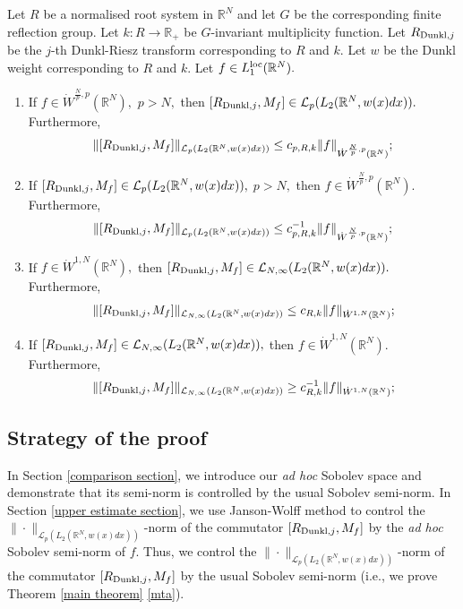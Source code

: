 \documentclass{amsart}
\numberwithin{equation}{section}
\begin{document}
\begin{theorem}\label{main theorem} Let $R$ be a normalised root system in $\mathbb{R}^N$ and let $G$ be the corresponding finite reflection group. Let $k:R\to\mathbb{R}_+$ be $G$-invariant multiplicity function. Let $R_{{\rm Dunkl},j}$ be the $j$-th Dunkl-Riesz transform corresponding to $R$ and $k.$ Let $w$ be the Dunkl weight corresponding to $R$ and $k.$ Let $f\in L_1^{{\rm loc}}(\mathbb{R}^N).$
\begin{enumerate}[{\rm (i)}]
\item\label{mta} If $f\in\dot{W}^{\frac{N}{p},p}(\mathbb{R}^N),$ $p>N,$ then $[R_{{\rm Dunkl},j},M_f]\in\mathcal{L}_p(L_2(\mathbb{R}^N,w(x)dx)).$ Furthermore,
$$\|[R_{{\rm Dunkl},j},M_f]\|_{\mathcal{L}_p(L_2(\mathbb{R}^N,w(x)dx))}\leq c_{p,R,k}\|f\|_{\dot{W}^{\frac{N}{p},p}(\mathbb{R}^N)};$$
\item\label{mtb} If $[R_{{\rm Dunkl},j},M_f]\in\mathcal{L}_p(L_2(\mathbb{R}^N,w(x)dx)),$ $p>N,$ then $f\in\dot{W}^{\frac{N}{p},p}(\mathbb{R}^N).$ Furthermore,
$$\|[R_{{\rm Dunkl},j},M_f]\|_{\mathcal{L}_p(L_2(\mathbb{R}^N,w(x)dx))}\leq c_{p,R,k}^{-1}\|f\|_{\dot{W}^{\frac{N}{p},p}(\mathbb{R}^N)};$$
\item\label{mtc} If $f\in\dot{W}^{1,N}(\mathbb{R}^N),$ then $[R_{{\rm Dunkl},j},M_f]\in\mathcal{L}_{N,\infty}(L_2(\mathbb{R}^N,w(x)dx)).$ Furthermore,
$$\|[R_{{\rm Dunkl},j},M_f]\|_{\mathcal{L}_{N,\infty}(L_2(\mathbb{R}^N,w(x)dx))}\leq c_{R,k}\|f\|_{\dot{W}^{1,N}(\mathbb{R}^N)};$$
\item\label{mtd} If $[R_{{\rm Dunkl},j},M_f]\in\mathcal{L}_{N,\infty}(L_2(\mathbb{R}^N,w(x)dx)),$ then $f\in\dot{W}^{1,N}(\mathbb{R}^N).$ Furthermore,
$$\|[R_{{\rm Dunkl},j},M_f]\|_{\mathcal{L}_{N,\infty}(L_2(\mathbb{R}^N,w(x)dx))}\geq c_{R,k}^{-1}\|f\|_{\dot{W}^{1,N}(\mathbb{R}^N)};$$
\end{enumerate}
\end{theorem}

\subsection{Strategy of the proof}

In Section \ref{comparison section}, we introduce our {\it ad hoc} Sobolev space and demonstrate that its semi-norm is controlled by the usual Sobolev semi-norm. In Section \ref{upper estimate section}, we use Janson-Wolff method to control the $\|\cdot\|_{\mathcal{L}_p(L_2(\mathbb{R}^N,w(x)dx))}$-norm of the commutator $[R_{{\rm Dunkl},j},M_f]$ by the {\it ad hoc} Sobolev semi-norm of $f.$ Thus, we control the $\|\cdot\|_{\mathcal{L}_p(L_2(\mathbb{R}^N,w(x)dx))}$-norm of the commutator $[R_{{\rm Dunkl},j},M_f]$ by the usual Sobolev semi-norm (i.e., we prove Theorem \ref{main theorem} \eqref{mta}).
\end{document}
